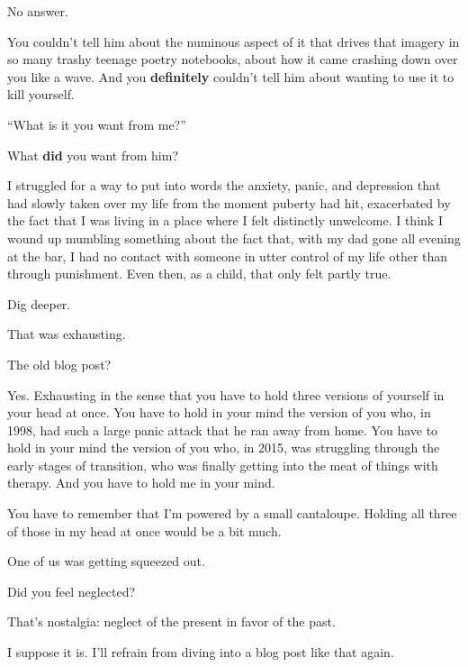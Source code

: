 \begin{paracol}{2}
\begin{leftcolumn}
No answer.

\begin{ally}
You couldn't tell him about the numinous aspect of it that drives that imagery in so many trashy teenage poetry notebooks, about how it came crashing down over you like a wave. And you \textbf{definitely} couldn't tell him about wanting to use it to kill yourself.
\end{ally}
``What is it you want from me?''

\begin{ally}
What \textbf{did} you want from him?
\end{ally}
I struggled for a way to put into words the anxiety, panic, and depression that had slowly taken over my life from the moment puberty had hit, exacerbated by the fact that I was living in a place where I felt distinctly unwelcome. I think I wound up mumbling something about the fact that, with my dad gone all evening at the bar, I had no contact with someone in utter control of my life other than through punishment. Even then, as a child, that only felt partly true.

\begin{ally}
Dig deeper.
\end{ally}
\newpage

\begin{ally}
That was exhausting.
\end{ally}
The old blog post?

\begin{ally}
Yes. Exhausting in the sense that you have to hold three versions of yourself in your head at once. You have to hold in your mind the version of you who, in 1998, had such a large panic attack that he ran away from home. You have to hold in your mind the version of you who, in 2015, was struggling through the early stages of transition, who was finally getting into the meat of things with therapy. And you have to hold me in your mind.
\end{ally}
You have to remember that I'm powered by a small cantaloupe. Holding all three of those in my head at once would be a bit much.

\begin{ally}
One of us was getting squeezed out.
\end{ally}
Did you feel neglected?

\begin{ally}
That's nostalgia: neglect of the present in favor of the past.
\end{ally}
I suppose it is. I'll refrain from diving into a blog post like that again.


\end{leftcolumn}
\end{paracol}
